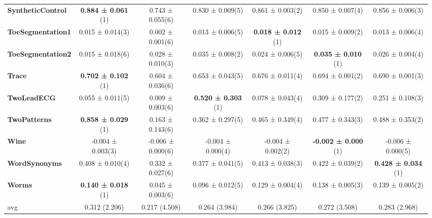 \begin{table}[ht]
\begin{adjustbox}{width=\textwidth}
\begin{tabular}{lcccccc}
    \textbf{SyntheticControl} & \textbf{0.884 ± 0.061} (1) & 0.743 ± 0.055(6) & 0.830 ± 0.009(5) & 0.861 ± 0.003(2) & 0.850 ± 0.007(4) & 0.856 ± 0.006(3) \\
    \textbf{ToeSegmentation1} & 0.015 ± 0.014(3) & 0.002 ± 0.001(6) & 0.013 ± 0.006(5) & \textbf{0.018 ± 0.012} (1) & 0.015 ± 0.009(2) & 0.013 ± 0.006(4) \\
    \textbf{ToeSegmentation2} & 0.015 ± 0.018(6) & 0.028 ± 0.010(3) & 0.035 ± 0.008(2) & 0.024 ± 0.006(5) & \textbf{0.035 ± 0.010} (1) & 0.026 ± 0.004(4) \\
    \textbf{Trace} & \textbf{0.702 ± 0.102} (1) & 0.604 ± 0.036(6) & 0.653 ± 0.043(5) & 0.676 ± 0.011(4) & 0.694 ± 0.001(2) & 0.690 ± 0.001(3) \\
    \textbf{TwoLeadECG} & 0.055 ± 0.011(5) & 0.009 ± 0.003(6) & \textbf{0.520 ± 0.303} (1) & 0.078 ± 0.043(4) & 0.309 ± 0.177(2) & 0.251 ± 0.108(3) \\
    \textbf{TwoPatterns} & \textbf{0.858 ± 0.029} (1) & 0.163 ± 0.143(6) & 0.362 ± 0.297(5) & 0.465 ± 0.349(4) & 0.477 ± 0.343(3) & 0.488 ± 0.353(2) \\
    \textbf{Wine} & -0.004 ± 0.003(3) & -0.006 ± 0.000(6) & -0.004 ± 0.000(4) & -0.004 ± 0.002(2) & \textbf{-0.002 ± 0.000} (1) & -0.006 ± 0.000(5) \\
    \textbf{WordSynonyms} & 0.408 ± 0.010(4) & 0.332 ± 0.027(6) & 0.377 ± 0.041(5) & 0.413 ± 0.038(3) & 0.422 ± 0.039(2) & \textbf{0.428 ± 0.034} (1) \\
    \textbf{Worms} & \textbf{0.140 ± 0.018} (1) & 0.045 ± 0.003(6) & 0.096 ± 0.012(5) & 0.129 ± 0.004(4) & 0.138 ± 0.005(3) & 0.139 ± 0.005(2) \\
    \hline 
    avg & 0.312 (2.206) & 0.217 (4.508) & 0.264 (3.984) & 0.266 (3.825) & 0.272 (3.508) & 0.283 (2.968) \\ 
    \hline
    \end{tabular}
    \end{adjustbox}
    \end{table}
    
    
    
